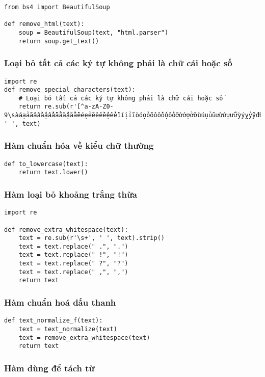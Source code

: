 \begin{verbatim}
from bs4 import BeautifulSoup

def remove_html(text):
    soup = BeautifulSoup(text, "html.parser")
    return soup.get_text()
\end{verbatim}
    

\subsubsection{Loại bỏ tất cả các ký tự không phải là chữ cái hoặc số}
\begin{verbatim}
import re
def remove_special_characters(text):
    # Loại bỏ tất cả các ký tự không phải là chữ cái hoặc số
    return re.sub(r'[^a-zA-Z0-9\sàáạảãâầấậẩẫăằắặẳẵèéẹẻẽêềếệểễìíịỉĩòóọỏõôồốộổỗơờớợởỡùúụủũưừứựửữỳýỵỷỹđĐÀÁẠẢÃÂẦẤẬẨẪĂẰẮẶẲẴÈÉẸẺẼÊỀẾỆỂỄÌÍỊỈĨÒÓỌỎÕÔỒỐỘỔỖƠỜỚỢỞỠÙÚỤỦŨƯỪỨỰỬỮỲÝỴỶỸ.!?]', ' ', text)
\end{verbatim}

\subsubsection{Hàm chuẩn hóa về kiểu chữ thường}

\begin{verbatim}
def to_lowercase(text):
    return text.lower()
\end{verbatim}

\subsubsection{Hàm loại bỏ khoảng trắng thừa}
\begin{verbatim}
import re

def remove_extra_whitespace(text):
    text = re.sub(r'\s+', ' ', text).strip()
    text = text.replace(" .", ".")
    text = text.replace(" !", "!")
    text = text.replace(" ?", "?")
    text = text.replace(" ,", ",")
    return text
\end{verbatim}

\subsubsection{Hàm chuẩn hoá dấu thanh}

\begin{verbatim}
def text_normalize_f(text):
    text = text_normalize(text)
    text = remove_extra_whitespace(text)
    return text
\end{verbatim}
\subsubsection{Hàm dùng để tách từ}

